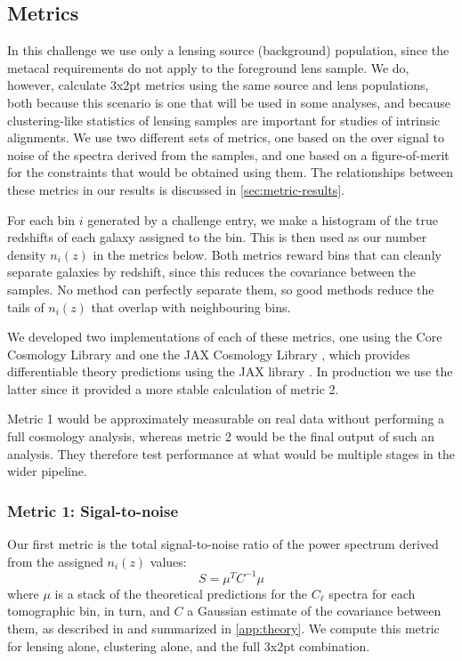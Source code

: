 \documentclass[twocolumn,twocolappendix]{aastex63}
\begin{document}
\subsection{Metrics}
\label{sec:metrics}

In this challenge we use only a lensing source (background) population, since the metacal requirements
do not apply to the foreground lens sample. We do, however, calculate 3x2pt metrics using the
same source and lens populations, both because this scenario is one that will be used in some analyses,
and because clustering-like statistics of lensing samples are important for studies of intrinsic
alignments. We use two different sets of metrics, one based on the over signal to noise of the spectra 
derived from the samples, and one based on a figure-of-merit for the constraints that would be obtained 
using them. The relationships between these metrics in our results is discussed in \autoref{sec:metric-results}.

For each bin $i$ generated by a challenge entry, we make a histogram of the true redshifts 
of each galaxy assigned to the bin.  This is then used as our number density $n_i(z)$ in the metrics 
below. Both metrics reward bins that can
cleanly separate galaxies by redshift, since this reduces the covariance between the samples. No
method can perfectly separate them, so good methods reduce the tails of $n_i(z)$ that overlap with 
neighbouring bins.

We developed two implementations of each of these metrics, one using the Core Cosmology Library 
\citep{ccl} and one the JAX Cosmology Library \citep{jax-cosmo}, which provides differentiable theory 
predictions using the JAX library \citep{jax}.  In production we use the latter since it provided a
more stable calculation of metric 2.

Metric 1 would be approximately measurable on real data without performing a full cosmology analysis,
whereas metric 2 would be the final output of such an analysis.  They therefore test performance at what
would be multiple stages in the wider pipeline.


\subsubsection{Metric 1: Sigal-to-noise}
Our first metric is the total signal-to-noise ratio of the power spectrum derived from the assigned
$n_i(z)$ values:
\begin{equation}
    S = \mu^{T} C^{-1} \mu
\label{eq:snr}
\end{equation}
where $\mu$ is a stack of the theoretical predictions for the $C_\ell$ spectra for each tomographic 
bin, in turn, and $C$ a Gaussian estimate of the covariance between them, as described in
\citet{takada_jain} and summarized in \autoref{app:theory}.   We compute this metric for lensing alone, clustering alone, and the full 3x2pt combination.
\end{document}
